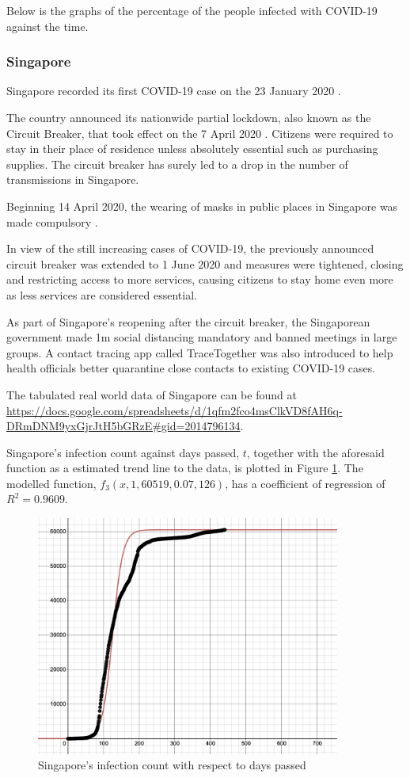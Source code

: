 \documentclass[a4paper,titlepage]{article}
\begin{document}
Below is the graphs of the percentage of the people infected with COVID-19 against the time.

\subsubsection{Singapore}

Singapore recorded its first COVID-19 case on the 23 January 2020 \cite{covidtimeline_yong_2021}.

The country announced its nationwide partial lockdown, also known as the Circuit Breaker, that took effect on the 7 April 2020 \cite{covidlaw_ng_2020}. Citizens were required to stay in their place of residence unless absolutely essential such as purchasing supplies. The circuit breaker has surely led to a drop in the number of transmissions in Singapore.

Beginning 14 April 2020, the wearing of masks in public places in Singapore was made compulsory \cite{covidsg_who_2021}.

In view of the still increasing cases of COVID-19, the previously announced circuit breaker was extended to 1 June 2020 and measures were tightened, closing and restricting access to more services, causing citizens to stay home even more as less services are considered essential.

As part of Singapore's reopening after the circuit breaker, the Singaporean government made 1m social distancing mandatory and banned meetings in large groups. A contact tracing app called TraceTogether was also introduced to help health officials better quarantine close contacts to existing COVID-19 cases.

The tabulated real world data of Singapore can be found at \url{https://docs.google.com/spreadsheets/d/1qfm2fco4msClkVD8fAH6q-DRmDNM9yxGjrJtH5bGRzE#gid=2014796134}.

Singapore's infection count against days passed, $t$, together with the aforesaid function as a estimated trend line to the data, is plotted in Figure \ref{fig:rwG1}. The modelled function, $f_3(x,1,60519,0.07,126)$, has a coefficient of regression of $R^2=0.9609$.

\begin{figure}[htbp]
    \centering
    \includegraphics[width=10cm]{rwG1.png}
    \caption{Singapore's infection count with respect to days passed}
    \label{fig:rwG1}
\end{figure}
\end{document}
